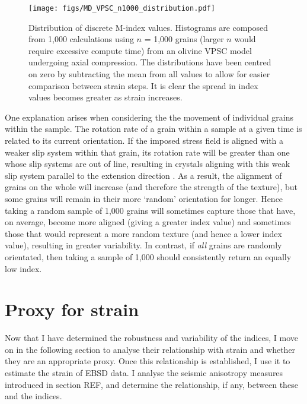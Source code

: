 \documentclass[a4paper,12pt,twoside]{report}
\numberwithin{equation}{chapter}
\begin{document}
\begin{figure}[h]
  \centering
    \texttt{[image: figs/MD\_VPSC\_n1000\_distribution.pdf]}
  \caption[Discrete M-index distribution (olivine VPSC)]{Distribution of discrete M-index values. Histograms are composed from 1,000 calculations using $n$ = 1,000 grains (larger $n$ would require excessive compute time) from an olivine VPSC model undergoing axial compression. The distributions have been centred on zero by subtracting the mean from all values to allow for easier comparison between strain steps. It is clear the spread in index values becomes greater as strain increases.}
  \label{fig:VPSC_md_dist}
\end{figure} 

One explanation arises when considering the the movement of individual grains within the sample. The rotation rate of a grain within a sample at a given time is related to its current orientation. If the imposed stress field is aligned with a weaker slip system within that grain, its rotation rate will be greater than one whose slip systems are out of line, resulting in crystals aligning with this weak slip system parallel to the extension direction \citep[e.g. post-perovskite,][]{Walker2012}. As a result, the alignment of grains on the whole will increase (and therefore the strength of the texture), but some grains will remain in their more \lq{}random\rq{} orientation for longer. Hence taking a random sample of 1,000 grains will sometimes capture those that have, on average, become more aligned (giving a greater index value) and sometimes those that would represent a more random texture (and hence a lower index value), resulting in greater variability. In contrast, if \emph{all} grains are randomly orientated, then taking a sample of 1,000 should consistently return an equally low index.     


\section{Proxy for strain}

Now that I have determined the robustness and variability of the indices, I move on in the following section to analyse their relationship with strain and whether they are an appropriate proxy. Once this relationship is established, I use it to estimate the strain of EBSD data. I analyse the seismic anisotropy measures introduced in section REF, and determine the relationship, if any, between these and the indices.   
\end{document}
